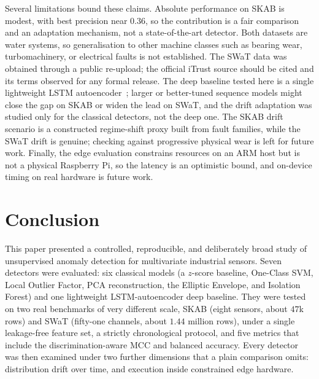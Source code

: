 \documentclass[runningheads]{llncs}
\begin{document}
Several limitations bound these claims. Absolute performance on SKAB is modest,
with best precision near $0.36$, so the contribution is a fair comparison and an
adaptation mechanism, not a state-of-the-art detector. Both datasets are water
systems, so generalisation to other machine classes such as bearing wear,
turbomachinery, or electrical faults is not established. The SWaT data was
obtained through a public re-upload; the official iTrust source should be cited
and its terms observed for any formal release. The deep baseline tested here is a
single lightweight LSTM autoencoder~\cite{malhotra2016}; larger or better-tuned
sequence models might close the gap on SKAB or widen the lead on SWaT, and the
drift adaptation was studied only for the classical detectors, not the deep one.
The SKAB drift scenario is a constructed regime-shift proxy built from
fault families, while the SWaT drift is genuine; checking against progressive
physical wear is left for future work. Finally, the edge evaluation constrains
resources on an ARM host but is not a physical Raspberry Pi, so the latency is an
optimistic bound, and on-device timing on real hardware is future work.

\section{Conclusion}
\label{sec:conclusion}
This paper presented a controlled, reproducible, and deliberately broad study of
unsupervised anomaly detection for multivariate industrial sensors. Seven
detectors were evaluated: six classical models (a $z$-score baseline, One-Class
SVM, Local Outlier Factor, PCA reconstruction, the Elliptic Envelope, and
Isolation Forest) and one lightweight LSTM-autoencoder deep baseline. They were
tested on two real benchmarks of very different scale, SKAB (eight sensors, about
$47$k rows) and SWaT (fifty-one channels, about $1.44$ million rows), under a
single leakage-free feature set, a strictly chronological protocol, and five
metrics that include the discrimination-aware MCC and balanced accuracy. Every
detector was then examined under two further dimensions that a plain comparison
omits: distribution drift over time, and execution inside constrained edge
hardware.
\end{document}
